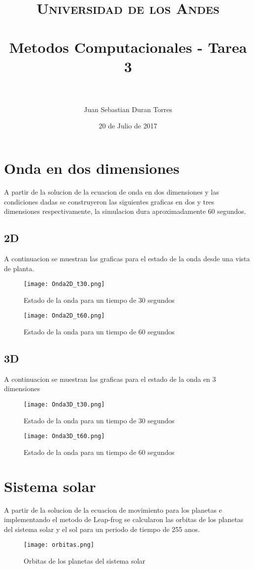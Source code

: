 \documentclass[paper=a4, fontsize=11pt]{scrartcl} %
\title{
\normalfont \normalsize 
\textsc{Universidad de los Andes} \\ [25pt]
\horrule{0.5pt} \\[0.4cm]
\huge Metodos Computacionales - Tarea 3  \\ 
\horrule{2pt} \\[0.5cm] 
}
\author{Juan Sebastian Duran Torres}
\date{20 de Julio de 2017}
\begin{document}
\maketitle


\section{Onda en dos dimensiones}

A partir de la solucion de la ecuacion de onda en dos dimensiones y las condiciones dadas se construyeron las siguientes graficas en dos y tres dimensiones respectivamente, la simulacion dura aproximadamente 60 segundos.
\subsection{ 2D} 
A continuacion se  muestran las graficas para el estado de la onda desde una vista de planta.
\begin{figure}[H]
	\centering
	\texttt{[image: Onda2D\_t30.png]}
	\caption{Estado de la onda para un tiempo de 30 segundos}
\end{figure}

\begin{figure}[H]
	\centering
	\texttt{[image: Onda2D\_t60.png]}
	\caption{Estado de la onda para un tiempo de 60 segundos}
\end{figure}


\subsection{3D}
A continuacion se muestran las graficas para el estado de la onda en 3 dimensiones

\begin{figure}[H]
	\centering
	\texttt{[image: Onda3D\_t30.png]}
	\caption{Estado de la onda para un tiempo de 30 segundos}
\end{figure}

\begin{figure}[H]
	\centering
	\texttt{[image: Onda3D\_t60.png]}
	\caption{Estado de la onda para un tiempo de 60 segundos}
\end{figure}



\section{Sistema solar}

A partir de la solucion de la ecuacion de movimiento para los planetas e implementando el metodo de Leap-frog se calcularon las orbitas de los planetas del sistema solar y el sol para un periodo de tiempo de 255 anos.
\begin{figure}[H]
	\centering
	\texttt{[image: orbitas.png]}
	\caption{Orbitas de los planetas del sistema solar}
\end{figure}
\end{document}
